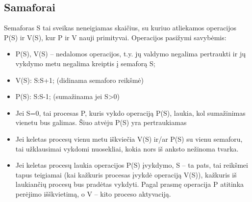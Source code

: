\subsection{Samaforai}

Semaforas S tai sveikas neneigiamas skaičius, su kuriuo atliekamos operacijos P(S) ir V(S), kur P ir V nauji primityvai. Operacijos pasižymi savybėmis:
\begin{itemize}
	\item P(S), V(S) – nedalomos operacijos, t.y. jų valdymo negalima pertraukti ir jų vykdymo metu negalima kreiptis į semaforą S;
	\item V(S):     S:S+1; (didinama semaforo reikšmė)
	\item P(S):      S:S-1; (sumažinama jei S>0)
	\item Jei S=0, tai procesas P, kuris vykdo operaciją P(S), laukia, kol sumažinimas vienetu bus galimas. Šiuo atvėju P(S) yra pertraukiamas
	\item Jei keletas procesų vienu metu iškviečia V(S) ir/ar P(S) su vienu semaforu, tai užklausimai vykdomi nuosekliai, kokia nors iš anksto nežinoma tvarka.
	\item Jei keletas procesų laukia operacijos P(S) įvykdymo, S – ta pats, tai reikšmei tapus teigiamai (kai kažkuris procesas įvykdė operaciją V(S)), kažkuris iš laukiančių procesų bus pradėtas vykdyti.
Pagal prasmę operacija P atitinka perėjimo išškvietimą, o V – kito proceso aktyvaciją.
\end{itemize}
